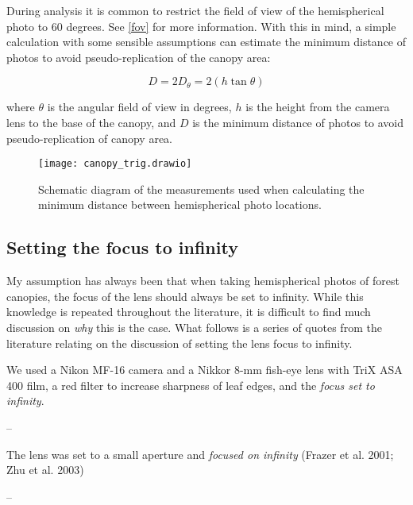 \documentclass{article}
\begin{document}
During analysis it is common to restrict the field of view of the hemispherical photo to 60 degrees. See \autoref{fov} for more information. With this in mind, a simple calculation with some sensible assumptions can estimate the minimum distance of photos to avoid pseudo-replication of the canopy area:

\begin{equation}
	D = 2D_{\theta} = 2(h \tan{\theta})
\end{equation}

where $\theta$ is the angular field of view in degrees, $h$ is the height from the camera lens to the base of the canopy, and $D$ is the minimum distance of photos to avoid pseudo-replication of canopy area.

\begin{figure}[H]
\centering
	\texttt{[image: canopy\_trig.drawio]}
	\caption{Schematic diagram of the measurements used when calculating the minimum distance between hemispherical photo locations.}
	\label{canopy_trig}
\end{figure}

\subsection{Setting the focus to infinity} 

My assumption has always been that when taking hemispherical photos of forest canopies, the focus of the lens should always be set to infinity. While this knowledge is repeated throughout the literature, it is difficult to find much discussion on \textit{why} this is the case. What follows is a series of quotes from the literature relating on the discussion of setting the lens focus to infinity.

\begin{minipage}{\linewidth}
\begin{framed}
We used a Nikon MF-16 camera and a Nikkor 8-mm fish-eye lens with TriX ASA 400 film, a red filter to increase sharpness of leaf edges, and the \textit{focus set to infinity}.

-- \citealt{Englund2000}
\end{framed}
\end{minipage}

\begin{minipage}{\linewidth}
\begin{framed}
The lens was set to a small aperture and \textit{focused on infinity} (Frazer et al. 2001; Zhu et al. 2003)

-- \citealt{Hu2009}
\end{framed}
\end{minipage}
\end{document}
